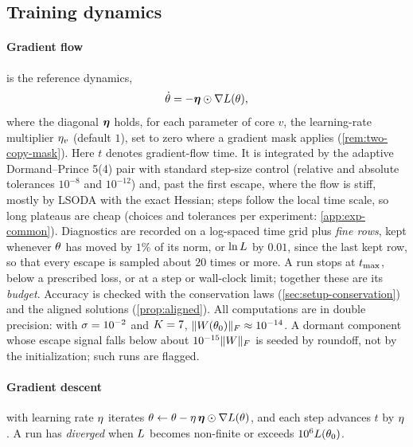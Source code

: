 \subsection{Training dynamics}\label{sec:setup-dynamics}

\paragraph{Gradient flow} is the reference dynamics,
\begin{equation}\label{eq:gf}
  \dot{\theta}=-\boldsymbol{\eta}\odot\nabla L(\theta),
\end{equation}
where the diagonal $\boldsymbol{\eta}$ holds, for each parameter of core $v$, the learning-rate
multiplier $\eta_{v}$ (default $1$), set to zero where a gradient mask applies
(\cref{rem:two-copy-mask}). Here $t$ denotes gradient-flow time. It is integrated by the adaptive
Dormand--Prince 5(4) pair \citep{dormand1980family} with standard step-size control
\citep[Sec.~II.4]{hairer1993solving} (relative and absolute tolerances $10^{-8}$ and $10^{-12}$) and,
past the first escape, where the flow is stiff, mostly by LSODA with the exact
Hessian; steps follow the local time scale, so long plateaus are cheap (choices and tolerances per
experiment: \cref{app:exp-common}). Diagnostics are recorded on a log-spaced time grid plus
\emph{fine rows}, kept whenever $\theta$ has moved by $1\%$ of its norm, or $\ln L$ by $0.01$,
since the last kept row, so that every escape is sampled about $20$ times or more. A run stops at
$t_{\max}$, below a prescribed loss, or at a step or wall-clock limit; together these are its
\emph{budget}. Accuracy is checked with the conservation laws (\cref{sec:setup-conservation}) and the
aligned solutions (\cref{prop:aligned}). All computations are in double precision: with
$\sigma=10^{-2}$ and $K=7$, $\lVert W(\theta_0)\rVert_{F}\approx10^{-14}$. A dormant component whose escape
signal falls below about $10^{-15}\lVert W\rVert_{F}$ is seeded by roundoff, not by the initialization; such
runs are flagged.

\paragraph{Gradient descent} with learning rate $\eta$ iterates
$\theta\leftarrow\theta-\eta\,\boldsymbol{\eta}\odot\nabla L(\theta)$, and each step advances $t$
by $\eta$. A run has \emph{diverged} when $L$ becomes non-finite or exceeds $10^{6}L(\theta_0)$.

